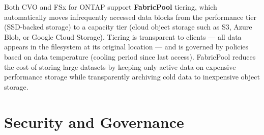Both CVO and FSx for ONTAP support \textbf{FabricPool} tiering, which automatically moves infrequently accessed data blocks from the performance tier (SSD-backed storage) to a capacity tier (cloud object storage such as S3, Azure Blob, or Google Cloud Storage). Tiering is transparent to clients --- all data appears in the filesystem at its original location --- and is governed by policies based on data temperature (cooling period since last access). FabricPool reduces the cost of storing large datasets by keeping only active data on expensive performance storage while transparently archiving cold data to inexpensive object storage.

\section{Security and Governance}

